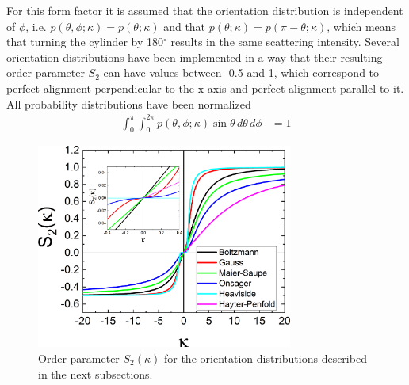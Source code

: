 For this form factor it is assumed that the orientation distribution is independent of $\phi$,
i.e. $p(\theta,\phi;\kappa)=p(\theta;\kappa)$ and that $p(\theta;\kappa)=p(\pi-\theta;\kappa)$, which means that turning the cylinder by 180$^\circ$ results in the same scattering intensity.
Several orientation distributions have been implemented in a way that their resulting order parameter $S_2$ can have values between -0.5 and 1, which correspond to perfect alignment perpendicular to the $\mathrm{x}$ axis and perfect alignment parallel to it. All probability distributions have been normalized
\begin{align}
\int_0^\pi \int_0^{2\pi} p(\theta,\phi;\kappa) \sin \theta \, d\theta \, d\phi&=1
\end{align}
\begin{figure}[htb]
\begin{center}
\includegraphics[width=0.75\textwidth]{../images/form_factor/cylindrical_obj/S2(kappa).png}
\end{center}
\caption{Order parameter $S_2(\kappa)$ for the orientation distributions described in the next subsections.}
\label{fig:S2_kappa}
\end{figure}

